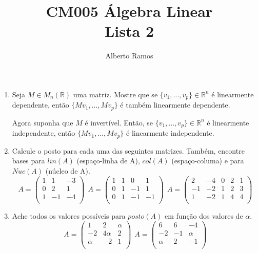 \documentclass{article}
\theoremstyle{plain}
\theoremstyle{obs}
\numberwithin{equation}{section}
\begin{document}
\title{ CM005 Álgebra Linear \\
        Lista 2 }

\begin{centering}    
\author{ Alberto Ramos }
\end{centering}

\date{ }

\maketitle

\begin{enumerate}
  \item Seja $M \in M_{n}(\mathbb{R})$ uma matriz. 
     Mostre que se $\{v_{1},\dots,v_{p}\} \in \mathbb{R}^{n}$ é linearmente dependente, então $\{Mv_1,\dots, Mv_p\}$ é também linearmente dependente.
     
      Agora suponha que $M$ é invertível. Então, se
      $\{v_{1},\dots,v_{p}\} \in \mathbb{R}^{n}$ é linearmente independente, 
      então $\{Mv_1,\dots, Mv_p\}$ é linearmente independente.    
     \item Calcule o posto para cada uma das seguintes matrizes. Também, 
     encontre bases para $lin(A)$ (espaço-linha de A), 
     $col(A)$ (espaço-columa) e para $Nuc(A)$ (núcleo de A).
       $$
       A=
       \begin{pmatrix}
       1 & 1 & -3 \\
       0 & 2 & 1 \\
       1 & -1 & -4 \\
       \end{pmatrix}
       \  \
       A=
       \begin{pmatrix}
       1 & 1 & 0 & 1  \\
       0 & 1 & -1 & 1 \\
       0 & 1 & -1 & -1 \\
       \end{pmatrix}
       \ \ 
       A=
       \begin{pmatrix}
       2 & -4 & 0 & 2 & 1 \\
       -1 & -2 & 1 & 2 & 3 \\
       1 & -2 & 1 & 4 & 4 \\
       \end{pmatrix}
       $$
       
       \item Ache todos os valores possíveis para $posto(A)$
       em função dos valores de $\alpha$. 
        $$
       A=
       \begin{pmatrix}
       1 & 2 & \alpha \\
       -2 & 4\alpha & 2 \\
       \alpha & -2 & 1 \\
       \end{pmatrix}
       \ \ 
       A=
       \begin{pmatrix}
       6 & 6 & -4 \\
       -2 & -1 & \alpha \\
       \alpha & 2 & -1 \\
       \end{pmatrix}
       $$
 

\end{enumerate}
\end{document}

